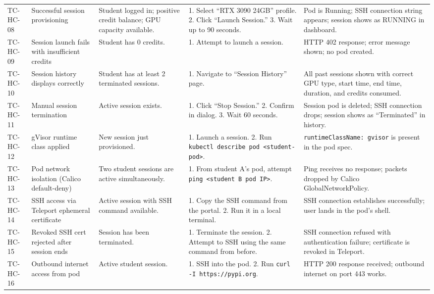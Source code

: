 \documentclass[12pt,a4paper]{article}
\begin{document}
\begin{longtable}{@{}L{2cm}L{3cm}L{3cm}L{3.5cm}L{3cm}@{}}
    TC-HC-08 & Successful session provisioning & Student logged in; positive credit balance; GPU capacity available. & 1. Select ``RTX 3090 24GB'' profile. 2. Click ``Launch Session.'' 3. Wait up to 90 seconds. & Pod is Running; SSH connection string appears; session shows as RUNNING in dashboard. \\
  TC-HC-09 & Session launch fails with insufficient credits & Student has 0 credits. & 1. Attempt to launch a session. & HTTP 402 response; error message shown; no pod created. \\
    TC-HC-10 & Session history displays correctly & Student has at least 2 terminated sessions. & 1. Navigate to ``Session History'' page. & All past sessions shown with correct GPU type, start time, end time, duration, and credits consumed. \\
  TC-HC-11 & Manual session termination & Active session exists. & 1. Click ``Stop Session.'' 2. Confirm in dialog. 3. Wait 60 seconds. & Session pod is deleted; SSH connection drops; session shows as ``Terminated'' in history. \\
    TC-HC-12 & gVisor runtime class applied & New session just provisioned. & 1. Launch a session. 2. Run \texttt{kubectl describe pod <student-pod>}. & \texttt{runtimeClassName: gvisor} is present in the pod spec. \\
  TC-HC-13 & Pod network isolation (Calico default-deny) & Two student sessions are active simultaneously. & 1. From student A's pod, attempt \texttt{ping <student B pod IP>}. & Ping receives no response; packets dropped by Calico GlobalNetworkPolicy. \\
    TC-HC-14 & SSH access via Teleport ephemeral certificate & Active session with SSH command available. & 1. Copy the SSH command from the portal. 2. Run it in a local terminal. & SSH connection establishes successfully; user lands in the pod's shell. \\
  TC-HC-15 & Revoked SSH cert rejected after session ends & Session has been terminated. & 1. Terminate the session. 2. Attempt to SSH using the same command from before. & SSH connection refused with authentication failure; certificate is revoked in Teleport. \\
    TC-HC-16 & Outbound internet access from pod & Active student session. & 1. SSH into the pod. 2. Run \texttt{curl -I https://pypi.org}. & HTTP 200 response received; outbound internet on port 443 works. \\

\end{longtable}
\end{document}
